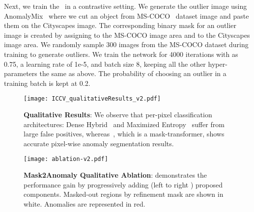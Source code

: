 \documentclass[10pt,twocolumn,letterpaper]{article}
\newcommand\our{\text{Mask2Anomaly}}
\begin{document}
Next, we train the~\our{} in a contrastive setting. We generate the outlier image using AnomalyMix~\cite{tian2022pixel} where we cut an object from MS-COCO~\cite{lin2014microsoft} dataset image and paste them on the Cityscapes image. The corresponding binary mask for an outlier image is created by assigning  to the MS-COCO image area and  to the Cityscapes image area. We randomly sample 300 images from the MS-COCO dataset during training to generate outliers. We train the network for 4000 iterations with  as 0.75, a learning rate of 1e-5, and batch size 8, keeping all the other hyper-parameters the same as above. The probability of choosing an outlier in a training batch is kept at 0.2. 
\begin{figure}[t]
    \begin{center}
     \texttt{[image: ICCV\_qualitativeResults\_v2.pdf]}
    \end{center}
    \vspace{-1.25em}
\caption{\textbf{Qualitative Results}: We observe that per-pixel classification architectures: Dense Hybrid~\cite{grcic2022densehybrid} and Maximized Entropy~\cite{chan2021entropy} suffer from large false positives, whereas~\our{}, which is a mask-transformer, shows accurate pixel-wise anomaly segmentation results. }
    \label{fig:main} \vspace{-1em}
\end{figure}
\begin{figure*}[t]
\begin{center}
\texttt{[image: ablation-v2.pdf]}
\end{center}
\vspace{-1.5em}
  \caption{\textbf{Mask2Anomaly Qualitative Ablation}: 
demonstrates the performance gain by progressively adding (left to right ) proposed components. Masked-out regions by refinement mask are shown in white. Anomalies are represented in {red}.}
\label{fig:ablation} \vspace{-1em}
\end{figure*}
\end{document}
